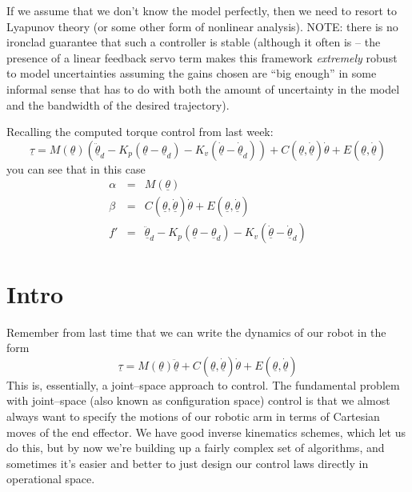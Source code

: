 \documentclass[]{article}
\begin{document}
If we assume that we don't know the model perfectly, then we need to resort to Lyapunov theory (or some other form of nonlinear analysis). NOTE: there is no ironclad guarantee that such a controller is stable (although it often is -- the presence of a linear feedback servo term makes this framework  \textit{extremely} robust to model uncertainties assuming the gains chosen are ``big enough'' in some informal sense that has to do with both the amount of uncertainty in the model and the bandwidth of the desired trajectory).

Recalling the computed torque control from last week:
\begin{equation}
 \underline{\tau} = M(\underline{\theta})( \ddot{\underline{\theta}}_{d}- K_{p}(\underline{\theta} - \underline{\theta}_{d}) - K_{v}(\underline{\dot{\theta}} - \underline{\dot{\theta}}_{d})) +C(\underline{\theta}, \underline{\dot{\theta}})\dot{\theta} + E(\underline{\theta}, \underline{\dot{\theta}})  \label{computedtorque}
\end{equation}
you can see that in this case
\begin{eqnarray}
 \alpha & = & M(\underline{\theta}) \nonumber \\
 \beta & = & C(\underline{\theta}, \underline{\dot{\theta}})\dot{\theta} + E(\underline{\theta}, \underline{\dot{\theta}}) \nonumber \\
 f' & = & \ddot{\underline{\theta}}_{d}- K_{p}(\underline{\theta} - \underline{\theta}_{d}) - K_{v}(\underline{\dot{\theta}} - \underline{\dot{\theta}}_{d}) \nonumber
\end{eqnarray}

\section{Intro}

Remember from last time that we can write the dynamics of our robot in the form
\begin{equation}
 \underline{\tau} = M(\underline{\theta}) \ddot{\underline{\theta}} +C(\underline{\theta}, \underline{\dot{\theta}})\dot{\theta} + E(\underline{\theta}, \underline{\dot{\theta}}) \label{hamiltonian}
\end{equation}
This is, essentially, a joint--space approach to control. The fundamental problem with joint--space (also known as configuration space) control is that we almost always want to specify the motions of our robotic arm in terms of Cartesian moves of the end effector. We have good inverse kinematics schemes, which let us do this, but by now we're building up a fairly complex set of algorithms, and sometimes it's easier and better to just design our control laws directly in operational space.
\end{document}
